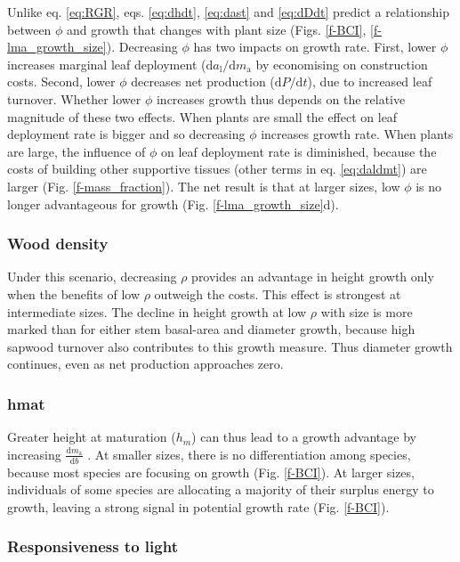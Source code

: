 \documentclass[12pt, a4paper]{article}
\begin{document}
Unlike eq. \ref{eq:RGR}, eqs. \ref{eq:dhdt}, \ref{eq:dast} and
\ref{eq:dDdt} predict a relationship between $\phi$ and growth that
changes with plant size (Figs. \ref{f-BCI}, \ref{f-lma_growth_size}).
Decreasing $\phi$ has two impacts on growth rate. First, lower
$\phi$ increases marginal leaf deployment
($\textrm{d}a_\textrm{l} / \textrm{d}m_\textrm{a}$ by economising on
construction costs. Second, lower $\phi$ decreases net production
($\textrm{d}P / \textrm{d}t$), due to increased leaf turnover. Whether
lower $\phi$ increases growth thus depends on the relative magnitude
of these two effects. When plants are small the effect on leaf
deployment rate is bigger and so decreasing $\phi$ increases growth
rate. When plants are large, the influence of $\phi$ on leaf
deployment rate is diminished, because the costs of building other
supportive tissues (other terms in eq. \ref{eq:daldmt}) are larger (Fig.
\ref{f-mass_fraction}). The net result is that at larger sizes, low
$\phi$ is no longer advantageous for growth (Fig.
\ref{f-lma_growth_size}d).

\subsubsection{Wood density}

Under this scenario, decreasing $\rho$ provides an advantage in height
growth only when the benefits of low $\rho$ outweigh the costs. This
effect is strongest at intermediate sizes. The decline in height growth
at low $\rho$ with size is more marked than for either stem basal-area
and diameter growth, because high sapwood turnover also contributes to
this growth measure. Thus diameter growth continues, even as net
production approaches zero.

\subsubsection{hmat}

 Greater height at maturation ($h_m$)
can thus lead to a growth advantage by increasing
$\frac{\textrm{d}m_\textrm{a}}{\textrm{d}b}$ . At smaller sizes, there is no differentiation
among species, because most species are focusing on growth (Fig.
\ref{f-BCI}). At larger sizes, individuals of some species are
allocating a majority of their surplus energy to growth, leaving a
strong signal in potential growth rate (Fig. \ref{f-BCI}).


\subsubsection{Responsiveness to light}
\end{document}
